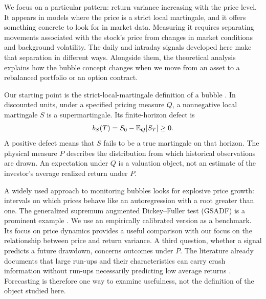 We focus on a particular pattern: return variance increasing with the price
level. It appears in models where the price is a strict local martingale,
and it offers something concrete to look for in market data. Measuring it
requires separating movements associated with the stock's price from changes
in market conditions and background volatility. The daily and intraday
signals developed here make that separation in different ways. Alongside
them, the theoretical analysis explains how the bubble concept changes
when we move from an asset to a rebalanced portfolio or an option contract.

Our starting point is the strict-local-martingale definition of a bubble
\cite{jarrow2007complete}. In discounted units, under a specified pricing
measure $Q$, a nonnegative local martingale $S$ is a supermartingale. Its
finite-horizon defect is
\begin{equation}\label{eq:defect}
 b_S(T)=S_0-\mathbb{E}_Q[S_T]\geq0.
\end{equation}
A positive defect means that $S$ fails to be a true martingale on that horizon.
The physical measure $P$ describes the distribution from which historical
observations are drawn. An expectation under $Q$ is a valuation object, not an
estimate of the investor's average realized return under $P$.

A widely used approach to monitoring bubbles looks for explosive price
growth: intervals on which prices behave like an autoregression with a
root greater than one. The generalized supremum augmented Dickey--Fuller
test (GSADF) is a prominent example \cite{phillips2012multiple}. We use an
empirically calibrated version as a benchmark. Its focus on price dynamics
provides a useful comparison with our focus on the relationship between
price and return variance. A third question, whether a signal predicts a future drawdown,
concerns outcomes under $P$. The literature already documents that large
run-ups and their characteristics can carry crash information without run-ups
necessarily predicting low average returns \cite{greenwood2017bubbles}.
Forecasting is therefore one way to examine usefulness, not the definition of
the object studied here.

